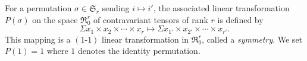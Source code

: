 For a permutation $\sigma \in \mathfrak{S}_r$ sending $i \mapsto i'$, the associated linear transformation $P(\sigma)$ on the space $\Re_0^r$ of contravariant tensors of rank $r$ is defined by
$$\Sigma x_1 \times x_2 \times \cdots \times x_r \mapsto \Sigma x_{1'} \times x_{2'} \times \cdots \times x_{r'}.$$
This mapping is a $(1\text{-}1)$ linear transformation in $\Re_0^r$, called a \textit{symmetry}. We set $P(1) = 1$ where $1$ denotes the identity permutation.
